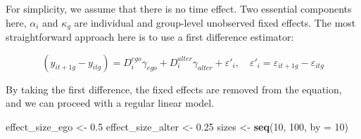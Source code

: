\documentclass[
]{book}
\newenvironment{Shaded}{\begin{snugshade}}{\end{snugshade}}
\newcommand{\AttributeTok}[1]{\textcolor[rgb]{0.13,0.29,0.53}{#1}}
\newcommand{\DecValTok}[1]{\textcolor[rgb]{0.00,0.00,0.81}{#1}}
\newcommand{\FloatTok}[1]{\textcolor[rgb]{0.00,0.00,0.81}{#1}}
\newcommand{\FunctionTok}[1]{\textcolor[rgb]{0.13,0.29,0.53}{\textbf{#1}}}
\newcommand{\NormalTok}[1]{#1}
\newcommand{\OtherTok}[1]{\textcolor[rgb]{0.56,0.35,0.01}{#1}}
\begin{document}
For simplicity, we assume that there is no time effect. Two essential components here,
\(\alpha_i\) and \(\kappa_g\) are individual and group-level unobserved fixed effects.
The most straightforward approach here is to use a first difference estimator:

\[
(y_{it+1g} - y_{itg}) = D_{i}^{ego}\gamma_{ego} + D_i^{alter}\gamma_{alter}  + \varepsilon'_i, \quad \varepsilon'_i = \varepsilon_{it+1g} - \varepsilon_{itg}
\]

By taking the first difference, the fixed effects are removed from the equation,
and we can proceed with a regular linear model.

\begin{Shaded}
\begin{Highlighting}[]
\NormalTok{effect\_size\_ego   }\OtherTok{\textless{}{-}} \FloatTok{0.5}
\NormalTok{effect\_size\_alter }\OtherTok{\textless{}{-}} \FloatTok{0.25}
\NormalTok{sizes }\OtherTok{\textless{}{-}} \FunctionTok{seq}\NormalTok{(}\DecValTok{10}\NormalTok{, }\DecValTok{100}\NormalTok{, }\AttributeTok{by =} \DecValTok{10}\NormalTok{)}
\end{Highlighting}
\end{Shaded}
\end{document}
